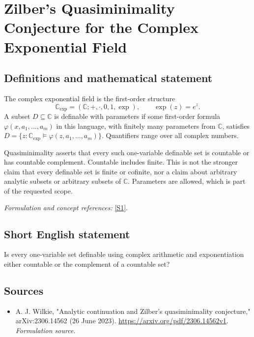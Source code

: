 \documentclass[11pt]{article}
\begin{document}
\section*{\texorpdfstring{Zilber's Quasiminimality Conjecture for the Complex Exponential Field}{Zilber's Quasiminimality Conjecture for the Complex Exponential Field}}\label{475}
\subsection{Definitions and mathematical statement}
The complex exponential field is the first-order structure
\[
 {\mathbb{C}}_{\exp}=({\mathbb{C}};+ ,\cdot,0,1,\exp),\qquad \exp(z)=e^z.
\]
A subset $D\subseteq{\mathbb{C}}$ is definable with parameters if some first-order formula $\varphi(x,a_1,\ldots,a_m)$ in this language, with finitely many parameters from ${\mathbb{C}}$, satisfies $D=\{z:{\mathbb{C}}_{\exp}\models\varphi(z,a_1,\ldots,a_m)\}$. Quantifiers range over all complex numbers.

Quasiminimality asserts that every such one-variable definable set is countable or has countable complement. Countable includes finite. This is not the stronger claim that every definable set is finite or cofinite, nor a claim about arbitrary analytic subsets or arbitrary subsets of ${\mathbb{C}}$. Parameters are allowed, which is part of the requested scope.
\par\smallskip\textit{Formulation and concept references:} \href{https://arxiv.org/pdf/2306.14562v1}{[S1]}.

\subsection{Short English statement}
Is every one-variable set definable using complex arithmetic and exponentiation either countable or the complement of a countable set?
\subsection{Sources}
\begin{itemize}
\item[S1]A. J. Wilkie, "Analytic continuation and Zilber's quasiminimality conjecture," arXiv:2306.14562 (26 June 2023).
\url{https://arxiv.org/pdf/2306.14562v1}.
\textit{Formulation source.}
\end{itemize}
\end{document}
